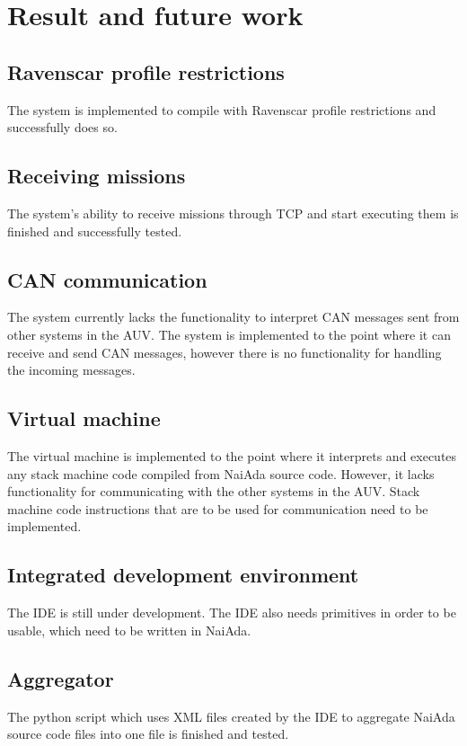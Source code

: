 \section{Result and future work}\label{sec:result}
\newline
\subsection{Ravenscar profile restrictions}
The system is implemented to compile with Ravenscar profile restrictions \cite{article:mcsraven} and successfully does so.

\subsection{Receiving missions}
The system's ability to receive missions through TCP and start executing them is finished and successfully tested.

\subsection{CAN communication}
The system currently lacks the functionality to interpret CAN messages sent from other systems in the AUV. The system is implemented to the point where it can receive and send CAN messages, however there is no functionality for handling the incoming messages.

\subsection{Virtual machine}
The virtual machine is implemented to the point where it interprets and executes any stack machine code compiled from NaiAda source code. However, it lacks functionality for communicating with the other systems in the AUV. Stack machine code instructions that are to be used for communication need to be implemented.

\subsection{Integrated development environment}
The IDE is still under development. The IDE also needs primitives in order to be usable, which need to be written in NaiAda.

\subsection{Aggregator}
The python script which uses XML files created by the IDE to aggregate NaiAda source code files into one file is finished and tested.

